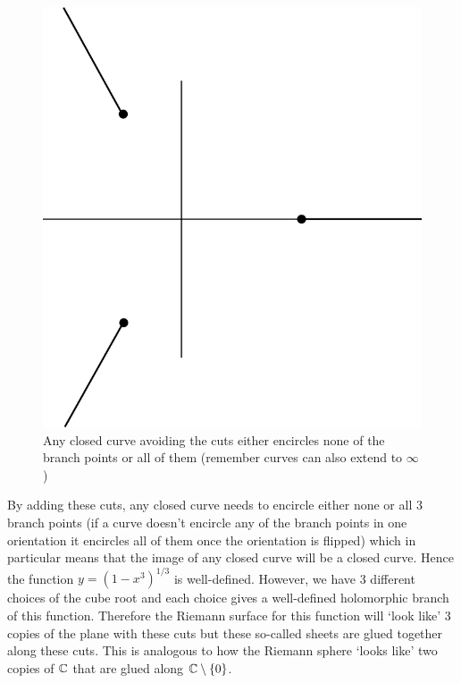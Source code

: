 \begin{figure}[ht]
    \centering
    \includegraphics[scale=0.8]{Images/riem_surf_cuts.png}
    \caption{Any closed curve avoiding the cuts either encircles none of the branch points or all of them (remember curves can also extend to $\infty$)}
    \label{fig:riem-surf-cuts}
\end{figure}

By adding these cuts, any closed curve needs to encircle either none or all 3 branch points (if a curve doesn't encircle any of the branch points in one orientation it encircles all of them once the orientation is flipped) which in particular means that the image of any closed curve will be a closed curve. Hence the function $y = (1 - x^3)^{1/3}$ is well-defined. However, we have 3 different choices of the cube root and each choice gives a well-defined holomorphic branch of this function. Therefore the Riemann surface for this function will `look like' 3 copies of the plane with these cuts but these so-called sheets are glued together along these cuts. This is analogous to how the Riemann sphere `looks like' two copies of $\mathbb{C}$ that are glued along $\mathbb{C} \setminus \{0\}$. 


